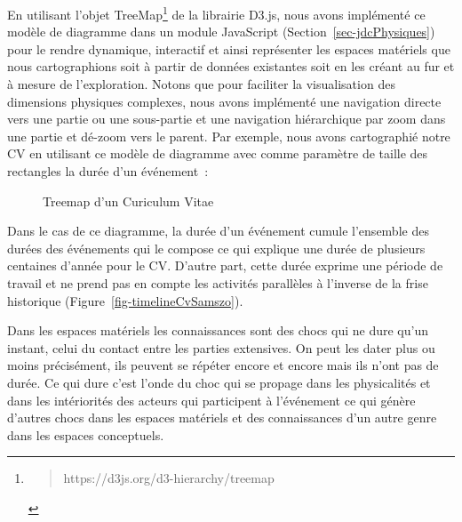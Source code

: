 \documentclass[
  a4paper,
  DIV=11,
  numbers=noendperiod]{scrreprt}
\begin{document}
En utilisant l'objet TreeMap\footnote{\begin{quote}
  https://d3js.org/d3-hierarchy/treemap
  \end{quote}} de la librairie D3.js, nous avons implémenté ce modèle de
diagramme dans un module JavaScript (Section~\ref{sec-jdcPhysiques})
pour le rendre dynamique, interactif et ainsi représenter les espaces
matériels que nous cartographions soit à partir de données existantes
soit en les créant au fur et à mesure de l'exploration. Notons que pour
faciliter la visualisation des dimensions physiques complexes, nous
avons implémenté une navigation directe vers une partie ou une
sous-partie et une navigation hiérarchique par zoom dans une partie et
dé-zoom vers le parent. Par exemple, nous avons cartographié notre CV en
utilisant ce modèle de diagramme avec comme paramètre de taille des
rectangles la durée d'un événement~:

\begin{figure}


\caption{\label{fig-treeMapCv}Treemap d'un Curiculum Vitae}

\end{figure}%

Dans le cas de ce diagramme, la durée d'un événement cumule l'ensemble
des durées des événements qui le compose ce qui explique une durée de
plusieurs centaines d'année pour le CV. D'autre part, cette durée
exprime une période de travail et ne prend pas en compte les activités
parallèles à l'inverse de la frise historique
(Figure~\ref{fig-timelineCvSamszo}).

Dans les espaces matériels les connaissances sont des chocs qui ne dure
qu'un instant, celui du contact entre les parties extensives. On peut
les dater plus ou moins précisément, ils peuvent se répéter encore et
encore mais ils n'ont pas de durée. Ce qui dure c'est l'onde du choc qui
se propage dans les physicalités et dans les intériorités des acteurs
qui participent à l'événement ce qui génère d'autres chocs dans les
espaces matériels et des connaissances d'un autre genre dans les espaces
conceptuels.
\end{document}
